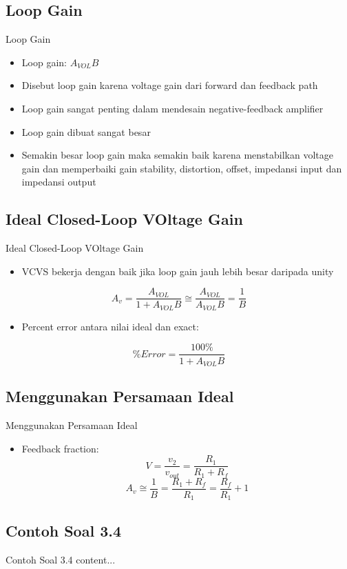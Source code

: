 \subsection{Loop Gain}
\begin{frame}{Loop Gain}
	\begin{itemize}
		\item Loop gain: $ A_{VOL} B$
		\item Disebut loop gain karena voltage gain dari forward dan feedback path
		\item Loop gain sangat penting dalam mendesain negative-feedback amplifier
		\item Loop gain dibuat sangat besar
		\item Semakin besar loop gain maka semakin baik karena menstabilkan voltage gain dan memperbaiki gain stability, distortion, offset, impedansi input dan impedansi output
	\end{itemize}
\end{frame}

\subsection{Ideal Closed-Loop VOltage Gain}
\begin{frame}{Ideal Closed-Loop VOltage Gain}
	\begin{itemize}
		\item VCVS bekerja dengan baik jika loop gain jauh lebih besar daripada unity
	\end{itemize}

	\begin{equation}\label{pers-17.04}
		A_v = \frac{A_{VOL}}{1 + A_{VOL} B} \cong \frac{A_{VOL}}{A_{VOL} B} = \frac{1}{B}
	\end{equation}

	\begin{itemize}
		\item Percent error antara nilai ideal dan exact:
	\end{itemize}

	\begin{equation}\label{pers-17.05}
		\% Error = \frac{100\%}{1 + A_{VOL} B}
	\end{equation}
\end{frame}

\subsection{Menggunakan Persamaan Ideal}
\begin{frame}{Menggunakan Persamaan Ideal}
	\begin{itemize}
		\item Feedback fraction:
		\begin{equation}\label{pers-17.06}
			V = \frac{v_2}{v_{out}} = \frac{R_1}{R_1 + R_f}
		\end{equation}
		\[ A_v \cong \frac{1}{B} = \frac{R_1 + R_f}{R_1} = \frac{R_f}{R_1} + 1 \]
	\end{itemize}
\end{frame}

\subsection{Contoh Soal 3.4}
\begin{frame}{Contoh Soal 3.4}
	content...
\end{frame}